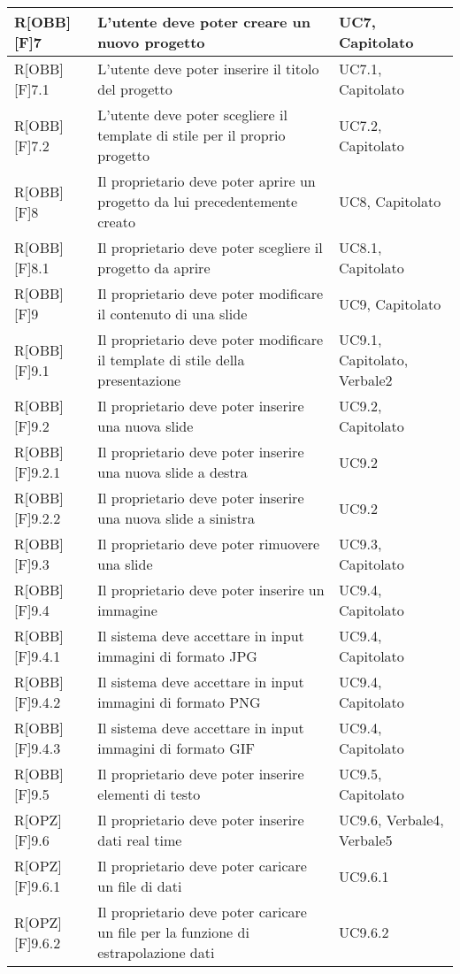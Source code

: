	\begin{table}[h]
		\begin{tabular}{|p{}|p{}|p{}|}
			\midrule

			R[OBB][F]7 & L'utente deve poter creare un nuovo progetto & UC7, Capitolato \\ \midrule
			R[OBB][F]7.1 & L'utente deve poter inserire il titolo del progetto & UC7.1, Capitolato \\ \midrule
			R[OBB][F]7.2 & L'utente deve poter scegliere il \gls{template} di stile per il proprio progetto & UC7.2, Capitolato \\ \midrule
			R[OBB][F]8 & Il proprietario deve poter aprire un progetto da lui precedentemente creato & UC8, Capitolato \\ \midrule
			R[OBB][F]8.1 & Il proprietario deve poter scegliere il progetto da aprire & UC8.1, Capitolato \\ \midrule
			R[OBB][F]9 & Il proprietario deve poter modificare il contenuto di una \gls{slide} & UC9, Capitolato \\ \midrule
			R[OBB][F]9.1 & Il proprietario deve poter modificare il \gls{template} di stile della presentazione & UC9.1, Capitolato, Verbale2 \\ \midrule
			R[OBB][F]9.2 & Il proprietario deve poter inserire una nuova \gls{slide} & UC9.2, Capitolato \\ \midrule
			R[OBB][F]9.2.1 & Il proprietario deve poter inserire una nuova \gls{slide} a destra & UC9.2 \\ \midrule
			R[OBB][F]9.2.2 & Il proprietario deve poter inserire una nuova \gls{slide} a sinistra & UC9.2 \\ \midrule
			R[OBB][F]9.3 & Il proprietario deve poter rimuovere una \gls{slide} & UC9.3, Capitolato \\ \midrule
			R[OBB][F]9.4 & Il proprietario deve poter inserire un immagine & UC9.4, Capitolato \\ \midrule
			R[OBB][F]9.4.1 & Il sistema deve accettare in input immagini di formato JPG & UC9.4, Capitolato \\ \midrule
			R[OBB][F]9.4.2 & Il sistema deve accettare in input immagini di formato \gls{PNG} & UC9.4, Capitolato \\ \midrule
			R[OBB][F]9.4.3 & Il sistema deve accettare in input immagini di formato GIF & UC9.4, Capitolato \\ \midrule
			R[OBB][F]9.5 & Il proprietario deve poter inserire elementi di testo & UC9.5, Capitolato \\ \midrule
			R[OPZ][F]9.6 & Il proprietario deve poter inserire dati \gls{real time} & UC9.6, Verbale4, Verbale5 \\ \midrule
			R[OPZ][F]9.6.1 & Il proprietario deve poter caricare un file di dati & UC9.6.1 \\ \midrule
			R[OPZ][F]9.6.2 & Il proprietario deve poter caricare un file per la funzione di estrapolazione dati & UC9.6.2 \\ \midrule

		\end{tabular}
	\end{table}
	\newpage

